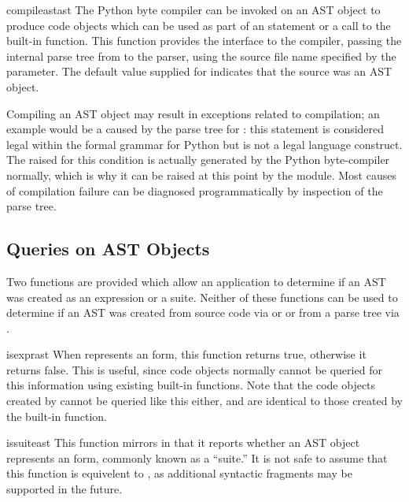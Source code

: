 \begin{funcdesc}{compileast}{ast}
The Python byte compiler can be invoked on an AST object to produce
code objects which can be used as part of an  statement or
a call to the built-in  function.
This function provides the interface to the compiler, passing the
internal parse tree from  to the parser, using the
source file name specified by the  parameter.
The default value supplied for  indicates that
the source was an AST object.

Compiling an AST object may result in exceptions related to
compilation; an example would be a  caused by the
parse tree for : this statement is considered legal
within the formal grammar for Python but is not a legal language
construct.  The  raised for this condition is
actually generated by the Python byte-compiler normally, which is why
it can be raised at this point by the  module.  Most
causes of compilation failure can be diagnosed programmatically by
inspection of the parse tree.
\end{funcdesc}


\subsection{Queries on AST Objects}
\label{Querying ASTs}

Two functions are provided which allow an application to determine if
an AST was created as an expression or a suite.  Neither of these
functions can be used to determine if an AST was created from source
code via  or  or from a parse tree
via .

\begin{funcdesc}{isexpr}{ast}
When  represents an  form, this function
returns true, otherwise it returns false.  This is useful, since code
objects normally cannot be queried for this information using existing
built-in functions.  Note that the code objects created by
 cannot be queried like this either, and are
identical to those created by the built-in
 function.
\end{funcdesc}


\begin{funcdesc}{issuite}{ast}
This function mirrors  in that it reports whether an
AST object represents an  form, commonly known as a
``suite.''  It is not safe to assume that this function is equivelent
to , as additional syntactic fragments may
be supported in the future.
\end{funcdesc}


